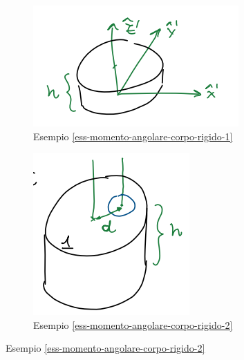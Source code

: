 \begin{figure}[h!]
    \begin{subfigure}{0.39\textwidth}
        \centering
        \includegraphics[width=\textwidth]{images/ess-momento-angolare-corpo-rigido-1.png}
        \caption*{Esempio \ref{ess-momento-angolare-corpo-rigido-1}}
    \end{subfigure}
    \begin{subfigure}{0.2\textwidth}
        \centering
        \includegraphics[width=\textwidth]{images/ess-momento-angolare-corpo-rigido-2.png}
        \caption*{Esempio \ref{ess-momento-angolare-corpo-rigido-2}}

\end{subfigure}
\end{figure}

